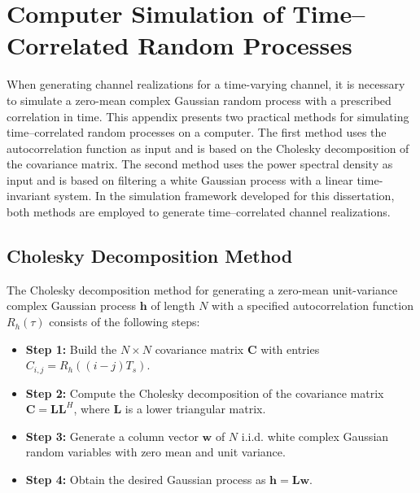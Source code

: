 \chapter[Computer Simulation of Time--Correlated Processes]{Computer Simulation of Time--Correlated Random Processes}
\label{appendix:time_correlated_processes}

When generating channel realizations for a time-varying channel, it is necessary to simulate a zero-mean complex Gaussian random process with a prescribed correlation in time.
This appendix presents two practical methods for simulating time--correlated random processes on a computer.
The first method uses the autocorrelation function as input and is based on the Cholesky decomposition of the covariance matrix.
The second method uses the power spectral density as input and is based on filtering a white Gaussian process with a linear time-invariant system.
In the simulation framework developed for this dissertation, both methods are employed to generate time--correlated channel realizations.


\section{Cholesky Decomposition Method}
\label{appendix:cholesky_method}

The Cholesky decomposition method for generating a zero-mean unit-variance complex Gaussian process $\mathbf{h}$ of length $N$ with a specified autocorrelation function $R_h(\tau)$ consists of the following steps:
\begin{itemize}[label={}, leftmargin=0.5cm]
    
    \item \textbf{Step 1:} 
    Build the $N \times N$ covariance matrix $\mathbf{C}$ with entries $C_{i,j} = R_h((i-j)T_s)$.
    
    \item \textbf{Step 2:} 
    Compute the Cholesky decomposition of the covariance matrix $\mathbf{C} = \mathbf{L}\mathbf{L}^H$, where $\mathbf{L}$ is a lower triangular matrix.
    
    \item \textbf{Step 3:} 
    Generate a column vector $\mathbf{w}$ of $N$ i.i.d. white complex Gaussian random variables with zero mean and unit variance.
    
    \item \textbf{Step 4:}
    Obtain the desired Gaussian process as $\mathbf{h} = \mathbf{L}\mathbf{w}$.

\end{itemize}


